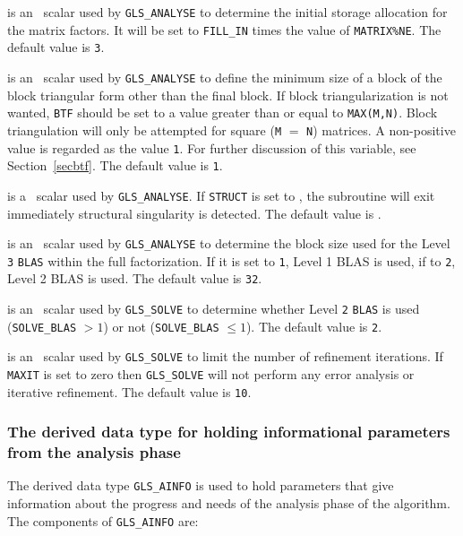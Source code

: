 \documentclass{galahad}
\newcommand{\packagename}{GLS}
\begin{document}
\begin{description}
 is an \integer\ scalar used by {\tt \packagename\_ANALYSE}
to determine the
initial storage allocation for the matrix factors.  It will be set to
{\tt FILL\_IN} times the value of {\tt MATRIX\%NE}.  
The default value is {\tt 3}.

 is an \integer\ scalar used by {\tt \packagename\_ANALYSE} to define
the minimum size of a block of the block triangular form
other than the final block.  If block triangularization is not wanted,
{\tt BTF} should be set to a value greater than or equal to
{\tt MAX(M,N)}. Block triangulation will only be attempted for square
({\tt M} $=$ {\tt N}) matrices.
A non-positive value is regarded as the value {\tt 1}.  For further
discussion of this variable, see Section~\ref{secbtf}.
The default value is {\tt 1}.

 is a \logical\ scalar used by 
{\tt \packagename\_ANALYSE}. If {\tt STRUCT} is
set to \true, the subroutine will exit immediately structural 
singularity is detected.  The default value is \false.

 is an \integer\ scalar used by 
{\tt \packagename\_ANALYSE} to determine
the block size used for the Level {\tt 3} {\tt BLAS} within the full
factorization.  If it is set to {\tt 1}, Level 1 BLAS is used, if to {\tt 2},
Level 2 BLAS is used.  The default value is {\tt 32}.

 is an \integer\ scalar used by {\tt \packagename\_SOLVE} to
determine whether Level {\tt 2} {\tt BLAS} is used ({\tt SOLVE\_BLAS}
$> 1$) or not ({\tt SOLVE\_BLAS} $\leq 1$). The default value is {\tt 2}.

 is an \integer\ scalar used by {\tt \packagename\_SOLVE} to limit
the number of refinement iterations.  If {\tt MAXIT} is set to zero then
{\tt \packagename\_SOLVE} will not perform any error analysis or 
iterative refinement.
The default value is {\tt 10}.
\end{description}


\subsubsection{The derived data type for holding informational
 parameters from the analysis phase}\label{typeinforma}
The derived data type 
{\tt \packagename\_AINFO} 
is used to hold parameters that give information about the progress and needs 
of the analysis phase of the algorithm. The components of
{\tt \packagename\_AINFO} 
are:
\end{document}
